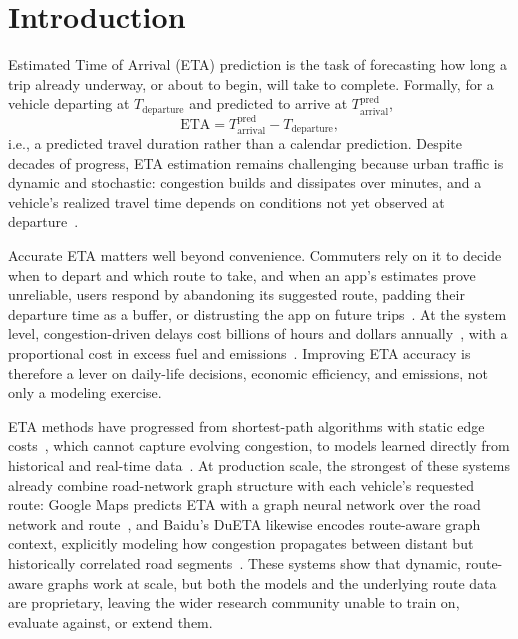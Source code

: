 \section{Introduction}\label{sec1}

Estimated Time of Arrival (ETA) prediction is the task of forecasting how long a trip already underway, or about to begin, will take to complete. Formally, for a vehicle departing at $T_{\mathrm{departure}}$ and predicted to arrive at $T_{\mathrm{arrival}}^{\mathrm{pred}}$,
\begin{equation}
\mathrm{ETA} = T_{\mathrm{arrival}}^{\mathrm{pred}} - T_{\mathrm{departure}}, \label{eq:eta-def}
\end{equation}
i.e., a predicted travel duration rather than a calendar prediction. Despite decades of progress, ETA estimation remains challenging because urban traffic is dynamic and stochastic: congestion builds and dissipates over minutes, and a vehicle's realized travel time depends on conditions not yet observed at departure~\cite{wang2022metatte}.

Accurate ETA matters well beyond convenience. Commuters rely on it to decide when to depart and which route to take, and when an app's estimates prove unreliable, users respond by abandoning its suggested route, padding their departure time as a buffer, or distrusting the app on future trips~\cite{Laor2022,hoseinzadeh2020waze,amin-naseri2018waze}. At the system level, congestion-driven delays cost billions of hours and dollars annually~\cite{INRIX2022Report}, with a proportional cost in excess fuel and emissions~\cite{IEA2022Transport}. Improving ETA accuracy is therefore a lever on daily-life decisions, economic efficiency, and emissions, not only a modeling exercise.

ETA methods have progressed from shortest-path algorithms with static edge costs~\cite{dijkstra1959}, which cannot capture evolving congestion, to models learned directly from historical and real-time data~\cite{chen2016xgboost,deepTTE2018,wang2022metatte}. At production scale, the strongest of these systems already combine road-network graph structure with each vehicle's requested route: Google Maps predicts ETA with a graph neural network over the road network and route~\cite{derrowpinion2021googlemaps}, and Baidu's DuETA likewise encodes route-aware graph context, explicitly modeling how congestion propagates between distant but historically correlated road segments~\cite{dueta2023}. These systems show that dynamic, route-aware graphs work at scale, but both the models and the underlying route data are proprietary, leaving the wider research community unable to train on, evaluate against, or extend them.


